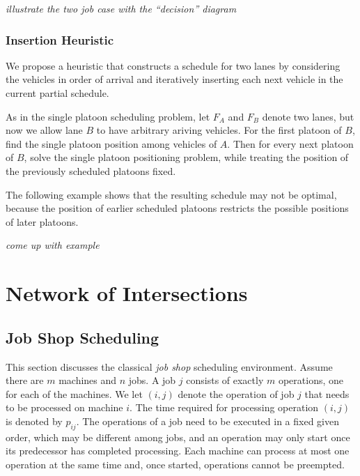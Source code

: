 \documentclass{article}
\theoremstyle{definition}
\theoremstyle{plain}
\begin{document}
\noindent
\textit{\textit{\color{blue}illustrate the two job case with the ``decision'' diagram}}

\subsubsection{Insertion Heuristic}

We propose a heuristic that constructs a schedule for two lanes by considering
the vehicles in order of arrival and iteratively inserting each next vehicle in
the current partial schedule.

As in the single platoon scheduling problem, let $F_{A}$ and $F_{B}$ denote two
lanes, but now we allow lane $B$ to have arbitrary ariving vehicles. For the
first platoon of $B$, find the single platoon position among vehicles of $A$.
Then for every next platoon of $B$, solve the single platoon positioning
problem, while treating the position of the previously scheduled platoons fixed.


The following example shows that the resulting schedule may not be optimal,
because the position of earlier scheduled platoons restricts the possible
positions of later platoons.
\begin{eg}
  \textit{\color{blue}come up with example}
\end{eg}


\newpage

\section{Network of Intersections}

\subsection{Job Shop Scheduling}

This section discusses the classical \textit{job shop} scheduling environment.
Assume there are $m$ machines and $n$ jobs. A job $j$ consists of exactly $m$
operations, one for each of the machines. We let $(i,j)$ denote the operation of
job $j$ that needs to be processed on machine $i$. The time required for
processing operation $(i,j)$ is denoted by $p_{ij}$. The operations of a job
need to be executed in a fixed given order, which may be different among jobs,
and an operation may only start once its predecessor has completed processing.
Each machine can process at most one operation at the same time and, once
started, operations cannot be preempted.
\end{document}
